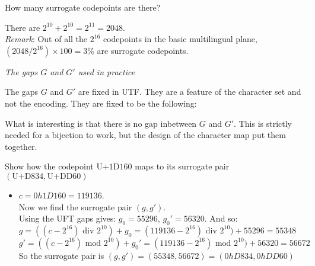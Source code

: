 



\frmrule 

\begin{example}
How many surrogate codepoints are there?

There are $2^10 + 2^10 = 2^11 = 2048$. \\
\textit{Remark}: Out of all the $2^{16}$ codepoints in the basic multilingual plane, 
$(2048/2^{16}) \times 100 = 3\%$ are surrogate codepoints.
\end{example}

\frmrule 

\textit{The gaps $G$ and $G'$ used in practice }

The gaps $G$ and $G'$ are fixed in UTF. 
They are a feature of the character set and not the 
encoding. They are fixed to be the following:\\


What is interesting is that there is no gap inbetween
$G$ and $G'$. This is strictly needed for a bijection to work,
but the design of the character map put them together.  


\frmrule 

\begin{example}
Show how the codepoint $\text{U+1D160}$ maps to its surrogate pair $(\text{U+D834},\text{U+DD60})$
\begin{itemize}
\item
$c = 0h1D160 = 119136$. \\
Now we find the surrogate pair $(g,g')$. \\
Using the UFT gaps gives: $g_0 = 55296$, $g_0' = 56320$. And so: \\
$g = ((c-2^{16}) \text{ div } 2^{10}) + g_0 = (119136-2^{16}) \text{ div } 2^{10}) + 55296 = 55348$\\
$g' = ((c-2^{16}) \text{ mod } 2^{10}) + g_0' = (119136-2^{16}) \text{ mod } 2^{10}) + 56320 = 56672$\\
So the surrogate pair is $(g,g') = (55348, 56672) = (0hD834, 0hDD60)$

\end{itemize}
\end{example}


